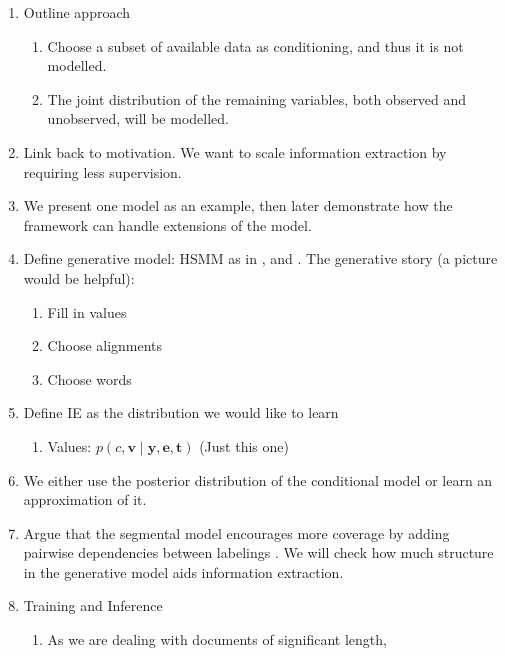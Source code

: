 \documentclass[11pt]{article}
\newcommand{\be}{\mathbf{e}}
\newcommand{\br}{\mathbf{r}}
\newcommand{\bt}{\mathbf{t}}
\newcommand{\bv}{\mathbf{v}}
\newcommand{\by}{\mathbf{y}}
\begin{document}
\begin{enumerate}
    \begin{enumerate}
    \item Outline approach
        \begin{enumerate}
        \item Choose a subset of available data as conditioning,
            and thus it is not modelled.
        \item The joint distribution of the remaining variables,
            both observed and unobserved, will be modelled.
        \end{enumerate}
    \item Link back to motivation. We want to scale information extraction
        by requiring less supervision.
    \item We present one model as an example, then later demonstrate how the framework
        can handle extensions of the model.
    \item Define generative model: HSMM as in \citep{liang2009semalign},
        and \citep{wiseman2018template}.
        The generative story (a picture would be helpful):
        \begin{enumerate}
        \item Fill in values
        \item Choose alignments
        \item Choose words
        \end{enumerate}
    \item Define IE as the distribution we would like to learn
        \begin{enumerate}
        \item Values: $p(c,\bv\mid\by,\be,\bt)$ (Just this one)
        \end{enumerate}
    \item We either use the posterior distribution of the conditional model
        or learn an approximation of it.
    \item Argue that the segmental model encourages more coverage
        by adding pairwise dependencies between labelings \citep{liang2009semalign}.
        We will check how much structure in the generative model
        aids information extraction.
    \item Training and Inference
        \begin{enumerate}
        \item As we are dealing with documents of significant length,

\end{enumerate}
\end{enumerate}
\end{enumerate}
\end{document}
